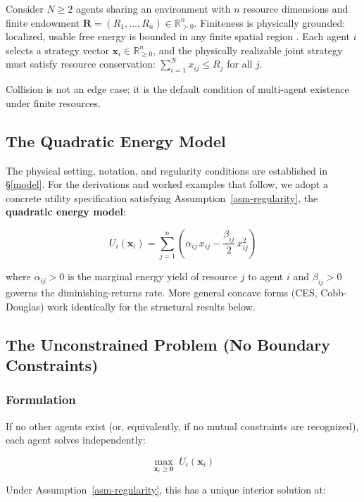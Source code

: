 \documentclass[11pt]{article}
\theoremstyle{plain}
\theoremstyle{definition}
\theoremstyle{remark}
\let\origsubsection\subsection
\renewcommand{\subsection}{\needspace{7\baselineskip}\origsubsection}
\let\origsubsubsection\subsubsection
\renewcommand{\subsubsection}{\needspace{4\baselineskip}\origsubsubsection}
\begin{document}
Consider \(N \geq 2\) agents sharing an environment with \(n\) resource
dimensions and finite endowment
\(\mathbf{R} = (R_1, \ldots, R_n) \in \mathbb{R}_{>0}^n\). Finiteness is
physically grounded: localized, usable free energy is bounded in any
finite spatial region \citep{Penrose2005}. Each agent \(i\) selects a
strategy vector \(\mathbf{x}_i \in \mathbb{R}_{\geq 0}^n\), and the
physically realizable joint strategy must satisfy resource conservation:
\(\sum_{i=1}^N x_{ij} \leq R_j\) for all \(j\).

Collision is not an edge case; it is the default condition of
multi-agent existence under finite resources.

\subsection{The Quadratic Energy
Model}\label{the-quadratic-energy-model}

The physical setting, notation, and regularity conditions are
established in §\ref{model}. For the derivations and worked examples
that follow, we adopt a concrete utility specification satisfying
Assumption~\ref{asm-regularity}, the \textbf{quadratic energy model}:

\[U_i(\mathbf{x}_i) = \sum_{j=1}^{n} \left( \alpha_{ij} \, x_{ij} - \frac{\beta_{ij}}{2} \, x_{ij}^2 \right)\]

where \(\alpha_{ij} > 0\) is the marginal energy yield of resource \(j\)
to agent \(i\) and \(\beta_{ij} > 0\) governs the diminishing-returns
rate. More general concave forms (CES, Cobb-Douglas) work identically
for the structural results below.

\subsection{The Unconstrained Problem (No Boundary
Constraints)}\label{the-unconstrained-problem-no-boundary-constraints}

\subsubsection{Formulation}\label{formulation}

If no other agents exist (or, equivalently, if no mutual constraints are
recognized), each agent solves independently:

\[\max_{\mathbf{x}_i \geq \mathbf{0}} \; U_i(\mathbf{x}_i)\]

Under Assumption~\ref{asm-regularity}, this has a unique interior
solution at:
\end{document}
